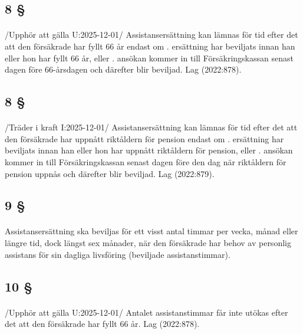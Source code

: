 \documentclass[a4paper,notitlepage,openany,10pt]{book}
\begin{document}
\subsection*{8 §}
\paragraph*{}
/Upphör att gälla U:2025-12-01/
Assistansersättning kan lämnas för tid efter det att den försäkrade har fyllt 66 år endast om
. ersättning har beviljats innan han eller hon har fyllt 66 år, eller
. ansökan kommer in till Försäkringskassan senast dagen före 66-årsdagen och därefter blir beviljad.
Lag (2022:878).
\subsection*{8 §}
\paragraph*{}
/Träder i kraft I:2025-12-01/
Assistansersättning kan lämnas för tid efter det att den försäkrade har uppnått riktåldern för pension endast om
. ersättning har beviljats innan han eller hon har uppnått riktåldern för pension, eller
. ansökan kommer in till Försäkringskassan senast dagen före den dag när riktåldern för pension uppnås och därefter blir beviljad.
Lag (2022:879).
\subsection*{9 §}
\paragraph*{}
Assistansersättning ska beviljas för ett visst antal timmar per vecka, månad eller längre tid, dock längst sex månader, när den försäkrade har behov av personlig assistans för sin dagliga livsföring (beviljade assistanstimmar).
\subsection*{10 §}
\paragraph*{}
/Upphör att gälla U:2025-12-01/
Antalet assistanstimmar får inte utökas efter det att den försäkrade har fyllt 66 år.
Lag (2022:878).
\end{document}
